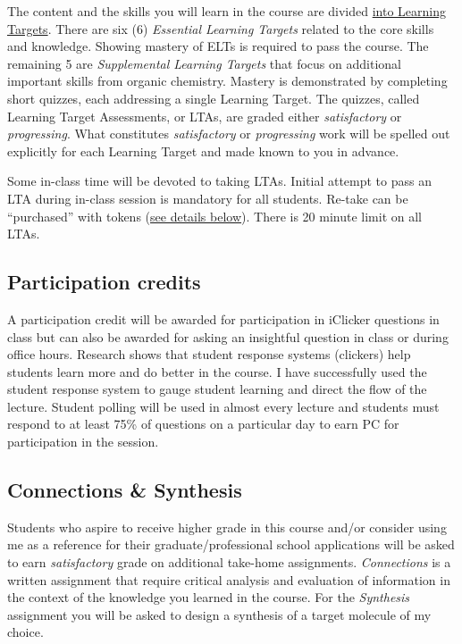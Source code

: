 The content and the skills you will learn in the course are divided
\protect\hyperlink{LT}{into Learning Targets}. There are six (6)
\emph{Essential Learning Targets} related to the core skills and
knowledge. Showing mastery of ELTs is required to pass the course. The
remaining 5 are \emph{Supplemental Learning Targets} that focus on
additional important skills from organic chemistry. Mastery is
demonstrated by completing short quizzes, each addressing a single
Learning Target. The quizzes, called Learning Target Assessments, or
LTAs, are graded either \emph{satisfactory} or \emph{progressing}. What
constitutes \emph{satisfactory} or \emph{progressing} work will be
spelled out explicitly for each Learning Target and made known to you in
advance.

Some in-class time will be devoted to taking LTAs. Initial attempt to
pass an LTA during in-class session is mandatory for all students.
Re-take can be ``purchased'' with tokens (\protect\hyperlink{tokens}{see
details below}). There is 20 minute limit on all LTAs.

\hypertarget{participation-credits}{%
\subsection{Participation credits}\label{participation-credits}}

A participation credit will be awarded for participation in iClicker
questions in class but can also be awarded for asking an insightful
question in class or during office hours. Research shows that student
response systems (clickers) help students learn more and do better in
the course. I have successfully used the student response system to
gauge student learning and direct the flow of the lecture. Student
polling will be used in almost every lecture and students must respond
to at least 75\% of questions on a particular day to earn PC for
participation in the session.

\hypertarget{connections-synthesis}{%
\subsection{Connections \& Synthesis}\label{connections-synthesis}}

Students who aspire to receive higher grade in this course and/or
consider using me as a reference for their graduate/professional school
applications will be asked to earn \emph{satisfactory} grade on
additional take-home assignments. \emph{Connections} is a written
assignment that require critical analysis and evaluation of information
in the context of the knowledge you learned in the course. For the
\emph{Synthesis} assignment you will be asked to design a synthesis of a
target molecule of my choice.

